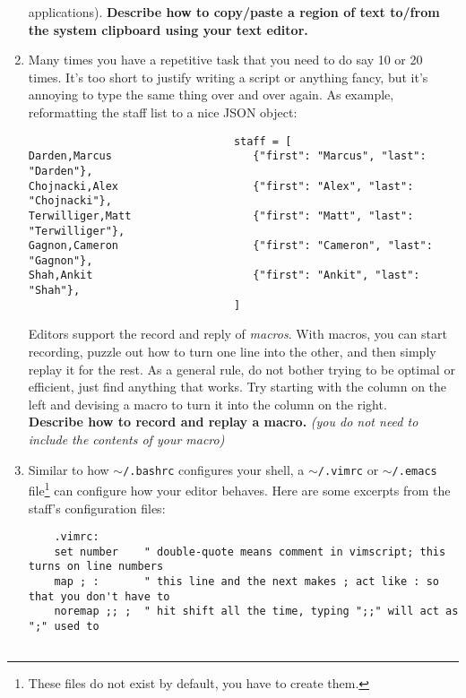 \documentclass{article}
\begin{document}
\begin{enumerate}
    applications).
    \textbf{Describe how to copy/paste a region of text to/from the system
    clipboard using your text editor.}
    \vspace{6em}
  \item Many times you have a repetitive task that you need to do say 10 or 20
    times. It's too short to justify writing a script or anything fancy, but
    it's annoying to type the same thing over and over again. As example,
    reformatting the staff list to a nice JSON object:
    \begin{verbatim}                                staff = [
Darden,Marcus                      {"first": "Marcus", "last": "Darden"},
Chojnacki,Alex                     {"first": "Alex", "last": "Chojnacki"},
Terwilliger,Matt                   {"first": "Matt", "last": "Terwilliger"},
Gagnon,Cameron                     {"first": "Cameron", "last": "Gagnon"},
Shah,Ankit                         {"first": "Ankit", "last": "Shah"},
                                ]\end{verbatim}
    Editors support the record and reply of \emph{macros}. With macros, you
    can start recording, puzzle out how to turn one line into the other, and
    then simply replay it for the rest. As a general rule, do not bother
    trying to be optimal or efficient, just find anything that works.
    Try starting with the column on the left and devising a macro to turn it
    into the column on the right.\\
    \textbf{Describe how to record and replay a macro.}
    \emph{\small (you do not need to include the contents of your macro)}
    \vspace{6em}

\newpage
  \item Similar to how \texttt{$\sim$/.bashrc} configures your shell, a
    \texttt{$\sim$/.vimrc} or \texttt{$\sim$/.emacs} file\footnote{
      These files do not exist by default, you have to create them.
    } can configure how your editor behaves. Here are some excerpts from the
    staff's configuration files:
    \begin{lstlisting}
    .vimrc:
    set number    " double-quote means comment in vimscript; this turns on line numbers
    map ; :       " this line and the next makes ; act like : so that you don't have to
    noremap ;; ;  " hit shift all the time, typing ";;" will act as ";" used to


\end{lstlisting}
\end{enumerate}
\end{document}
